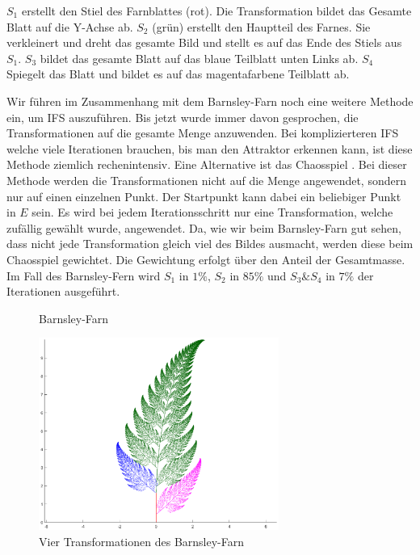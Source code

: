 $S_1$ erstellt den Stiel des Farnblattes (rot).
Die Transformation bildet das Gesamte Blatt auf die Y-Achse ab.
$S_2$ (grün) erstellt den Hauptteil des Farnes. 
Sie verkleinert und dreht das gesamte Bild und stellt es auf das Ende des Stiels aus $S_1$.
$S_3$ bildet das gesamte Blatt auf das blaue Teilblatt unten Links ab.
$S_4$ Spiegelt das Blatt und bildet es auf das magentafarbene Teilblatt ab.  

Wir führen im Zusammenhang mit dem Barnsley-Farn \cite{ifs:barnsleyfern} noch eine weitere Methode ein, um IFS auszuführen.
Bis jetzt wurde immer davon gesprochen, die Transformationen auf die gesamte Menge anzuwenden.
Bei komplizierteren IFS welche viele Iterationen brauchen, bis man den Attraktor erkennen kann, ist diese Methode ziemlich rechenintensiv.
Eine Alternative ist das Chaosspiel \cite{ifs:chaos}. 
Bei dieser Methode werden die Transformationen nicht auf die Menge angewendet, sondern nur auf einen einzelnen Punkt.
Der Startpunkt kann dabei ein beliebiger Punkt in $E$ sein.
Es wird bei jedem Iterationsschritt nur eine Transformation, welche zufällig gewählt wurde, angewendet.
Da, wie wir beim Barnsley-Farn gut sehen, dass nicht jede Transformation gleich viel des Bildes ausmacht, werden diese beim Chaosspiel gewichtet.
Die Gewichtung erfolgt über den Anteil der Gesamtmasse.
Im Fall des Barnsley-Fern wird $S_1$ in $1\%$, $S_2$ in $85\%$ und $S_3 \& S_4$ in $7\%$ der Iterationen ausgeführt. 
\begin{figure}	
	\centering
	\caption{Barnsley-Farn}
	\label{ifs:farn}
\end{figure}
\begin{figure}
	\centering
	\includegraphics[width=0.7\textwidth]{papers/ifs/images/farncolor}
	\caption{Vier Transformationen des Barnsley-Farn}
	\label{ifs:farncolor}
\end{figure}
